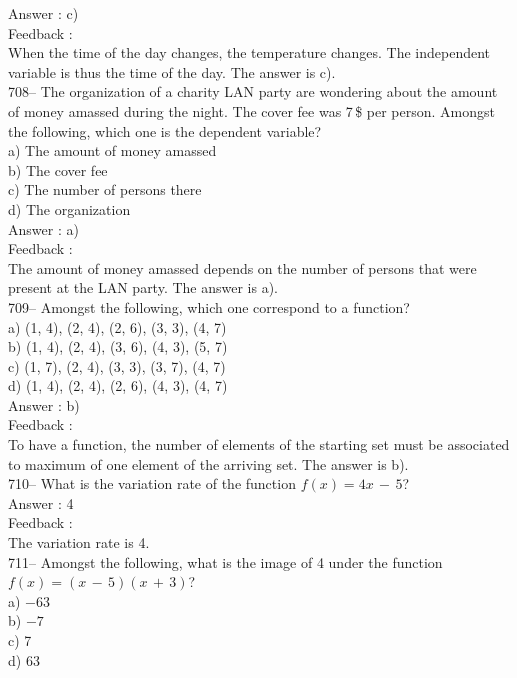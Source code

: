 \documentclass[letterpaper, 12pt]{article}
\begin{document}
Answer :  c)\\

Feedback : \\
When the time of the day changes, the temperature changes. The independent variable is thus the time of the day. The answer is
c).\\

708-- The organization of a charity LAN party are wondering about the amount of money amassed during the night. The cover fee was 7\,\$ per person.  Amongst the following, which one is the dependent variable?\\
a) The amount of money amassed\\
b) The cover fee\\
c) The number of persons there\\
d) The organization\\

Answer :  a)\\

Feedback :  \\
The amount of money amassed depends on the number of persons that were present at the LAN party. The answer is a).\\

709-- Amongst the following, which one correspond to a function?\\
a) {(1, 4), (2, 4), (2, 6), (3, 3), (4, 7)}\\
b) {(1, 4), (2, 4), (3, 6), (4, 3), (5, 7)}\\
c) {(1, 7), (2, 4), (3, 3), (3, 7), (4, 7)}\\
d) {(1, 4), (2, 4), (2, 6), (4, 3), (4, 7)}\\

Answer :  b)\\

Feedback :  \\
To have a function, the number of elements of the starting set must be associated to maximum of one element of the arriving set. The answer is b).\\

710-- What is the variation rate of the function $f(x)=4x\,-\,5$?\\

Answer :  4\\

Feedback :  \\
The variation rate is 4.\\

711-- Amongst the following, what is the image of 4 under the function $f(x)=(x\,-\,5)(x\,+\,3)$?\\
a) $-63$\\
b) $-7$\\
c) 7\\
d) 63\\
\end{document}

